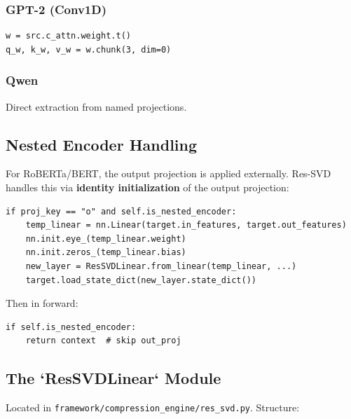 \subsubsection{GPT-2 (Conv1D)}

\begin{lstlisting}
w = src.c_attn.weight.t()
q_w, k_w, v_w = w.chunk(3, dim=0)
\end{lstlisting}

\subsubsection{Qwen}

Direct extraction from named projections.

\subsection{Nested Encoder Handling}

For RoBERTa/BERT, the output projection is applied externally. 
Res-SVD handles this via \textbf{identity initialization} of the output projection:

\begin{lstlisting}
if proj_key == "o" and self.is_nested_encoder:
    temp_linear = nn.Linear(target.in_features, target.out_features)
    nn.init.eye_(temp_linear.weight)
    nn.init.zeros_(temp_linear.bias)
    new_layer = ResSVDLinear.from_linear(temp_linear, ...)
    target.load_state_dict(new_layer.state_dict())
\end{lstlisting}

Then in forward:
\begin{lstlisting}
if self.is_nested_encoder:
    return context  # skip out_proj
\end{lstlisting}

\subsection{The `ResSVDLinear` Module}

Located in \texttt{framework/compression\_engine/res\_svd.py}. Structure:

